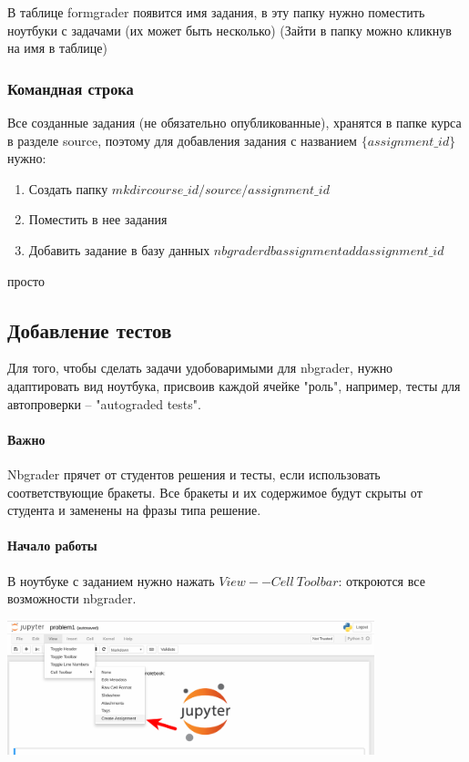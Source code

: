 \documentclass[a4paper,12pt]{article}
\begin{document}
В таблице formgrader появится имя задания, в эту папку нужно поместить ноутбуки с задачами (их может быть несколько)
(Зайти в папку можно кликнув на имя в таблице)
\subsubsection{Командная строка}

Все созданные задания (не обязательно опубликованные), хранятся в папке курса в разделе source, поэтому для добавления задания с названием $\{assignment\_id\}$ нужно:

\begin{enumerate}
    \item Создать папку $mkdir course\_id/source/assignment\_id$
    \item Поместить в нее задания
    \item Добавить задание в базу данных $nbgrader db assignment add assignment\_id$
\end{enumerate}

просто 
\subsection{Добавление тестов}

Для того, чтобы сделать задачи удобоваримыми для nbgrader, нужно адаптировать вид ноутбука, присвоив каждой ячейке "роль", например, тесты для автопроверки -- "autograded tests".

\paragraph{Важно}

Nbgrader прячет от студентов решения и тесты, если использовать соответствующие бракеты. Все бракеты и их содержимое будут скрыты от студента и заменены на фразы типа   решение\grqq.

\paragraph{Начало работы}

В ноутбуке с заданием нужно нажать $View -- Cell\ Toolbar$: откроются все возможности nbgrader.

\includegraphics[width=0.8\textwidth]{assignment_toolbar}
\end{document}
